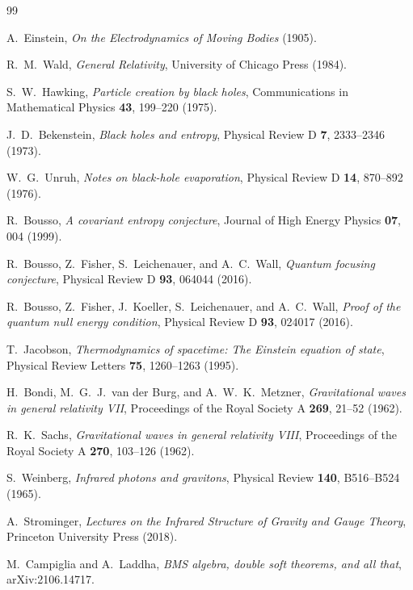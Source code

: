 \documentclass[12pt,a4paper]{article}
\theoremstyle{definition}
\theoremstyle{remark}
\begin{document}
\begin{thebibliography}{99}

A.~Einstein, \emph{On the Electrodynamics of Moving Bodies} (1905).

R.~M.~Wald, \emph{General Relativity}, University of Chicago Press (1984).

S.~W.~Hawking, \emph{Particle creation by black holes}, Communications in Mathematical Physics \textbf{43}, 199--220 (1975).

J.~D.~Bekenstein, \emph{Black holes and entropy}, Physical Review D \textbf{7}, 2333--2346 (1973).

W.~G.~Unruh, \emph{Notes on black-hole evaporation}, Physical Review D \textbf{14}, 870--892 (1976).

R.~Bousso, \emph{A covariant entropy conjecture}, Journal of High Energy Physics \textbf{07}, 004 (1999).

R.~Bousso, Z.~Fisher, S.~Leichenauer, and A.~C.~Wall, \emph{Quantum focusing conjecture}, Physical Review D \textbf{93}, 064044 (2016).

R.~Bousso, Z.~Fisher, J.~Koeller, S.~Leichenauer, and A.~C.~Wall, \emph{Proof of the quantum null energy condition}, Physical Review D \textbf{93}, 024017 (2016).

T.~Jacobson, \emph{Thermodynamics of spacetime: The Einstein equation of state}, Physical Review Letters \textbf{75}, 1260--1263 (1995).

H.~Bondi, M.~G.~J.~van der Burg, and A.~W.~K.~Metzner, \emph{Gravitational waves in general relativity VII}, Proceedings of the Royal Society A \textbf{269}, 21--52 (1962).

R.~K.~Sachs, \emph{Gravitational waves in general relativity VIII}, Proceedings of the Royal Society A \textbf{270}, 103--126 (1962).

S.~Weinberg, \emph{Infrared photons and gravitons}, Physical Review \textbf{140}, B516--B524 (1965).

A.~Strominger, \emph{Lectures on the Infrared Structure of Gravity and Gauge Theory}, Princeton University Press (2018).

M.~Campiglia and A.~Laddha, \emph{BMS algebra, double soft theorems, and all that}, arXiv:2106.14717.


\end{thebibliography}
\end{document}
